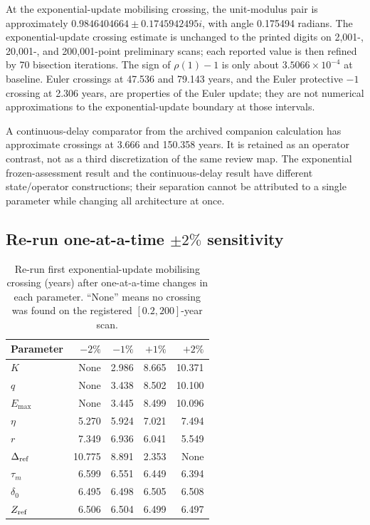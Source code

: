 At the exponential-update mobilising crossing, the unit-modulus pair is approximately \(0.9846404664\pm0.1745942495i\), with angle 0.175494 radians. The exponential-update crossing estimate is unchanged to the printed digits on 2,001-, 20,001-, and 200,001-point preliminary scans; each reported value is then refined by 70 bisection iterations. The sign of \(\rho(1)-1\) is only about \(3.5066\times10^{-4}\) at baseline. Euler crossings at 47.536 and 79.143 years, and the Euler protective \(-1\) crossing at 2.306 years, are properties of the Euler update; they are not numerical approximations to the exponential-update boundary at those intervals.

A continuous-delay comparator from the archived companion calculation has approximate crossings at 3.666 and 150.358 years. It is retained as an operator contrast, not as a third discretization of the same review map. The exponential frozen-assessment result and the continuous-delay result have different state/operator constructions; their separation cannot be attributed to a single parameter while changing all architecture at once.

\subsection{\texorpdfstring{Re-run one-at-a-time \(\pm2\%\) sensitivity}{Re-run one-at-a-time +/-2 percent sensitivity}}

\begin{table}[htbp]
\centering\scriptsize
\caption{Re-run first exponential-update mobilising crossing (years) after one-at-a-time changes in each parameter. ``None'' means no crossing was found on the registered \([0.2,200]\)-year scan.}
\label{tab:ota-sensitivity}
\begin{tabular}{@{}lrrrr@{}}
\toprule Parameter & \(-2\%\) & \(-1\%\) & \(+1\%\) & \(+2\%\) \\
\midrule
\(K\) & None & 2.986 & 8.665 & 10.371 \\
\(q\) & None & 3.438 & 8.502 & 10.100 \\
\(E_{\max}\) & None & 3.445 & 8.499 & 10.096 \\
\(\eta\) & 5.270 & 5.924 & 7.021 & 7.494 \\
\(r\) & 7.349 & 6.936 & 6.041 & 5.549 \\
\(\Delta_{\rm ref}\) & 10.775 & 8.891 & 2.353 & None \\
\(\tau_m\) & 6.599 & 6.551 & 6.449 & 6.394 \\
\(\delta_0\) & 6.495 & 6.498 & 6.505 & 6.508 \\
\(Z_{\rm ref}\) & 6.506 & 6.504 & 6.499 & 6.497 \\
\bottomrule
\end{tabular}
\end{table}

